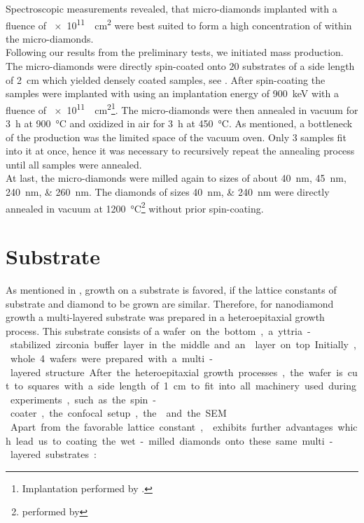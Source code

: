 		Spectroscopic measurements revealed, that micro-diamonds implanted with a fluence of \SI{e11}{\per\centi\meter\squared} were best suited to form a high concentration of \sivs within the micro-diamonds.
		\\
		Following our results from the preliminary tests, we initiated mass production.
		The micro-diamonds were directly spin-coated onto $20$ \ir substrates of a side length of \SI{2}{cm} which yielded densely coated samples, see .
		After spin-coating the samples were implanted with  using an implantation energy of \SI{900}{keV} with a fluence of \SI{e11}{\per\centi\meter\squared}\footnote{Implantation performed by \klug.}.
		The micro-diamonds were then annealed in vacuum for \SI{3}{\hour} at \SI{900}{\celsius} and oxidized in air for \SI{3}{\hour} at \SI{450}{\celsius}.
		As mentioned, a bottleneck of the production was the limited space of the vacuum oven.
		Only $3$ samples fit into it at once, hence it was necessary to recursively repeat the annealing process until all samples were annealed.
		\\
		At last, the micro-diamonds were milled again to sizes of about \SIlist{40;45;240;260}{nm}.
		The diamonds of sizes \SIlist{40;240}{nm} were directly annealed in vacuum at \SI{1200}{\celsius}\footnote{performed by \muzha} without prior spin-coating.

\section{\Ir Substrate}\label{sec::ir_substrate}

	As mentioned in , growth on a substrate is favored, if the lattice constants of substrate and diamond to be grown are similar.
	Therefore, for \CVD nanodiamond growth a multi-layered substrate was prepared in a heteroepitaxial growth process.
	This substrate consists of a \si wafer on the bottom, a yttria-stabilized zirconia buffer layer in the middle and an \ir layer on top.
	Initially, whole \SI{4}{\inch} wafers were prepared with a multi-layered structure.
	After the heteroepitaxial growth processes, the wafer is cut to squares with a side length of \SI{1}{cm} to fit into all machinery used during experiments, such as the spin-coater, the confocal setup, the \fib and the SEM.
	\\
	Apart from the favorable lattice constant, \ir exhibits further advantages which lead us to coating the wet-milled diamonds onto these same multi-layered substrates:


